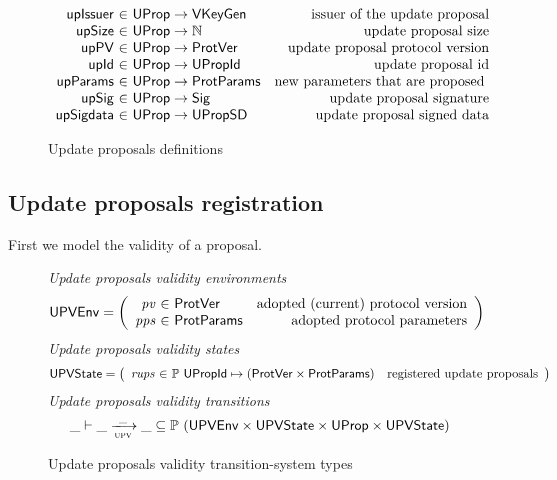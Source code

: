 \begin{figure}[htb]
  \begin{equation*}
    \begin{array}{r@{~\in~}lr}
      \fun{upIssuer} & \UProp \to \VKeyGen & \text{issuer of the update proposal}\\
      \fun{upSize} & \UProp \to \mathbb{N} & \text{update proposal size}\\
      \fun{upPV} & \UProp \to \ProtVer & \text{update proposal protocol version}\\
      \fun{upId} & \UProp \to \UPropId & \text{update proposal id}\\
      \fun{upParams} & \UProp \to \mathbb{\ProtParams}
                                           & \text{new parameters that are proposed }\\
      \fun{upSig} & \UProp \to \Sig & \text{update proposal signature}\\
      \fun{upSigdata} & \UProp \to \UPropSD & \text{update proposal signed data}
    \end{array}
  \end{equation*}
  \caption{Update proposals definitions}
  \label{fig:defs:update-proposals}
\end{figure}

\subsection{Update proposals registration}
\label{sec:update-proposals-registration}

First we model the validity of a proposal.

\begin{figure}[htb]
  \emph{Update proposals validity environments}
  \begin{equation*}
    \UPVEnv =
    \left(
      \begin{array}{r@{~\in~}lr}
        \var{pv} & \ProtVer & \text{adopted (current) protocol version}\\
        \var{pps} & \ProtParams & \text{adopted protocol parameters}\\
      \end{array}
    \right)
  \end{equation*}
  \emph{Update proposals validity states}
  \begin{equation*}
    \UPVState
    = \left(
      \begin{array}{r@{~\in~}lr}
        \var{rups} & \powerset{\UPropId \mapsto (\ProtVer \times \ProtParams)}
        & \text{registered update proposals}\\
      \end{array}
    \right)
  \end{equation*}
  \emph{Update proposals validity transitions}
    \begin{equation*}
    \var{\_} \vdash
    \var{\_} \trans{upv}{\_} \var{\_}
    \subseteq \powerset (\UPVEnv \times \UPVState \times \UProp \times \UPVState)
  \end{equation*}
  \caption{Update proposals validity transition-system types}
  \label{fig:ts-types:up-validity}
\end{figure}

